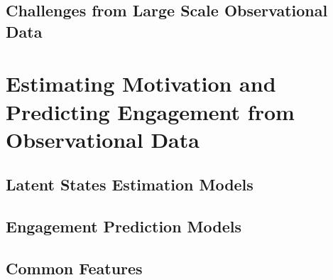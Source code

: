     \subsection{Challenges from Large Scale Observational Data}
    \label{challenges_large_scale}
    \lorem

\section{Estimating Motivation and Predicting Engagement from Observational Data}
\label{estpred_motivation_engagement}
\lorem
    \subsection{Latent States Estimation Models}
    \label{latent_estimation}
    \lorem
    \subsection{Engagement Prediction Models}
    \label{engagement_prediction}
    \lorem
    \subsection{Common Features}
    \label{estimation_prediction}
    \lorem

\lorem



